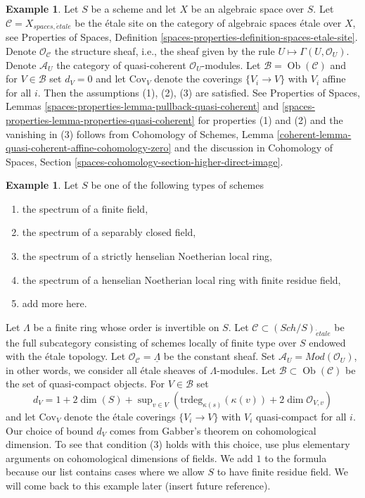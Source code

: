 \documentclass{stacks-project}
\theoremstyle{plain}
\theoremstyle{definition}
\newtheorem{example}[subsection]{Example}
\theoremstyle{remark}
\numberwithin{equation}{subsection}
\def\Sch{\mathit{Sch}}
\def\Ob{\mathop{\mathrm{Ob}}\nolimits}
\def\etale{{\acute{e}tale}}
\begin{document}
\begin{example}
\label{example-quasi-coherent-spaces-etale}
Let $S$ be a scheme and let $X$ be an algebraic space over $S$.
Let $\mathcal{C} = X_{spaces, \etale}$ be the \'etale site
on the category of algebraic spaces \'etale over $X$, see
Properties of Spaces, Definition
\ref{spaces-properties-definition-spaces-etale-site}.
Denote $\mathcal{O}_\mathcal{C}$ the structure sheaf, i.e., the
sheaf given by the rule $U \mapsto \Gamma(U, \mathcal{O}_U)$.
Denote $\mathcal{A}_U$ the category of quasi-coherent $\mathcal{O}_U$-modules.
Let $\mathcal{B} = \Ob(\mathcal{C})$ and for $V \in \mathcal{B}$
set $d_V = 0$ and let $\text{Cov}_V$ denote
the coverings $\{V_i \to V\}$ with $V_i$ affine for all $i$.
Then the assumptions (1), (2), (3) are satisfied.
See Properties of Spaces, Lemmas
\ref{spaces-properties-lemma-pullback-quasi-coherent} and
\ref{spaces-properties-lemma-properties-quasi-coherent}
for properties (1) and (2) and the vanishing in (3) follows from
Cohomology of Schemes, Lemma
\ref{coherent-lemma-quasi-coherent-affine-cohomology-zero}
and the discussion in Cohomology of Spaces, Section
\ref{spaces-cohomology-section-higher-direct-image}.
\end{example}

\begin{example}
\label{example-etale}
Let $S$ be one of the following types of schemes
\begin{enumerate}
\item the spectrum of a finite field,
\item the spectrum of a separably closed field,
\item the spectrum of a strictly henselian Noetherian local ring,
\item the spectrum of a henselian Noetherian local ring with
finite residue field,
\item add more here.
\end{enumerate}
Let $\Lambda$ be a finite ring whose order is invertible on $S$.
Let $\mathcal{C} \subset (\Sch/S)_\etale$
be the full subcategory consisting of schemes locally of finite
type over $S$ endowed with the \'etale topology.
Let $\mathcal{O}_\mathcal{C} = \underline{\Lambda}$ be the
constant sheaf. Set $\mathcal{A}_U = \textit{Mod}(\mathcal{O}_U)$,
in other words, we consider all \'etale sheaves of $\Lambda$-modules.
Let $\mathcal{B} \subset \Ob(\mathcal{C})$
be the set of quasi-compact objects. For $V \in \mathcal{B}$ set
$$
d_V = 1 + 2\dim(S) +
\sup\nolimits_{v \in V}(\text{trdeg}_{\kappa(s)}(\kappa(v)) +
2 \dim \mathcal{O}_{V, v})
$$
and let $\text{Cov}_V$ denote the \'etale coverings $\{V_i \to V\}$
with $V_i$ quasi-compact for all $i$.
Our choice of bound $d_V$ comes from Gabber's theorem
on cohomological dimension. To see that condition (3)
holds with this choice, use 
\cite[Expos\'e VIII-A, Corollary 1.2 and Lemma 2.2]{Traveaux}
plus elementary arguments on cohomological dimensions of fields.
We add $1$ to the formula because our list contains cases where we allow $S$
to have finite residue field.
We will come back to this example later (insert future reference).
\end{example}
\end{document}

